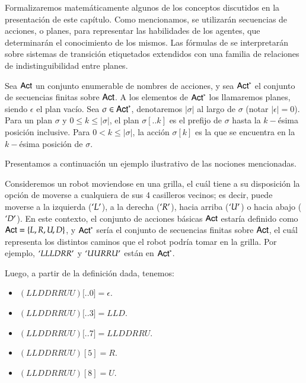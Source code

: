 Formalizaremos matemáticamente algunos de los conceptos discutidos en la presentación de este capítulo. Como mencionamos, se 
utilizarán secuencias de acciones, o planes, para representar las habilidades de los agentes, que determinarán el conocimiento de los mismos. 
Las fórmulas de \KHilogic se interpretarán sobre sistemas de transición etiquetados extendidos con una familia de relaciones de 
indistinguibilidad entre planes.

\begin{definicion}
    Sea ${\rm \sf Act}$ un conjunto enumerable de nombres de acciones, y sea ${\rm \sf Act}^*$ el conjunto de secuencias finitas sobre ${\rm \sf Act}$. 
    A los elementos de ${\rm \sf Act}^*$ los llamaremos planes, siendo $\epsilon$ el plan vacío. Sea $\sigma \in {\rm \sf Act}^*$, denotaremos $|\sigma|$ 
    al largo de $\sigma$ (notar $|\epsilon| = 0$). Para un plan $\sigma$ y $0 \leq k \leq |\sigma|$, el plan $\sigma[..k]$ es el prefijo 
    de $\sigma$ hasta la $k-$ésima posición inclusive. Para $0 < k \leq |\sigma|$, la acción $\sigma[k]$ es la que se encuentra en la 
    $k-$ésima posición de $\sigma$.  
\end{definicion}

Presentamos a continuación un ejemplo ilustrativo de las nociones mencionadas.

\begin{ejemplo}
    Consideremos un robot moviendose en una grilla, el cuál tiene a su disposición la opción de moverse a cualquiera de sus 4 casilleros vecinos; es decir,
    puede moverse a la izquierda ($`L'$), a la derecha ($`R'$), hacia arriba ($`U'$) o hacia abajo ($`D'$). En este contexto, el conjunto de acciones básicas 
    ${\rm \sf Act}$ estaría definido como ${\rm \sf Act} = \{L,R,U,D\}$, y ${\rm \sf Act}^*$ sería el conjunto de secuencias finitas sobre ${\rm \sf Act}$, el cuál representa los distintos 
    caminos que el robot podría tomar en la grilla. Por ejemplo, $`LLLDRR'$ y $`UURRU'$ están en ${\rm \sf Act}^*$. 

    Luego, a partir de la definición dada, tenemos:
    \begin{itemize}
        \item $(LLDDRRUU)[$..$0] = \epsilon$.
        \item $(LLDDRRUU)[$..$3] = LLD$.
        \item $(LLDDRRUU)[$..$7] = LLDDRRU$.
        \item $(LLDDRRUU)[5] = R$.
        \item $(LLDDRRUU)[8] = U$.
    \end{itemize}
\end{ejemplo}

